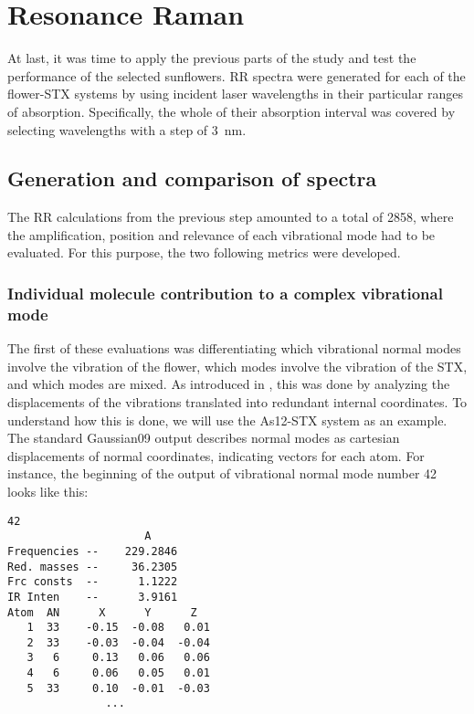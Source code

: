 \section{Resonance Raman}
At last, it was time to apply the previous parts of the study and test the performance of the selected sunflowers.
\blindtext
RR spectra were generated for each of the flower-STX systems by using incident laser wavelengths in their particular ranges of absorption.
Specifically, the whole of their absorption interval was covered by selecting wavelengths with a step of \SI{3}{\nano\metre}.
\blindtext

\subsection{Generation and comparison of spectra}
The RR calculations from the previous step amounted to a total of 2858, where the amplification, position and relevance of each vibrational mode had to be evaluated.
For this purpose, the two following metrics were developed.

\subsubsection{Individual molecule contribution to a complex vibrational mode}
The first of these evaluations was differentiating which vibrational normal modes involve the vibration of the flower, which modes involve the vibration of the STX, and which modes are mixed.
As introduced in , this was done by analyzing the displacements of the vibrations translated into redundant internal coordinates.
To understand how this is done, we will use the As12-STX system as an example.
The standard Gaussian09 output describes normal modes as cartesian displacements of normal coordinates, indicating vectors for each atom.
For instance, the beginning of the output of vibrational normal mode number 42 looks like this:

\begin{lstlisting}[label=normal-mode-output, style=kaolstplain]
                    42
                     A
Frequencies --    229.2846
Red. masses --     36.2305
Frc consts  --      1.1222
IR Inten    --      3.9161
Atom  AN      X      Y      Z
   1  33    -0.15  -0.08   0.01
   2  33    -0.03  -0.04  -0.04
   3   6     0.13   0.06   0.06
   4   6     0.06   0.05   0.01
   5  33     0.10  -0.01  -0.03
               ...
\end{lstlisting}

